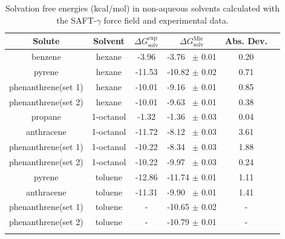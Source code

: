 \documentclass[preprint]{elsarticle}
\begin{document}
	\begin{table}
		\centering
		\caption{Solvation free energies (kcal/mol) in non-aqueous solvents calculated with the SAFT-$\gamma$ force field and experimental data.}
		\label{tbl:solv1}
		\begin{tabular}{cccccc}
			\hline\hline
			Solute       & Solvent   & $\Delta G_\text{solv}^\text{exp}$ & $\Delta G_\text{solv}^\text{Mie}$ & Abs. Dev.  \\ \hline
			benzene      & hexane    & -3.96                   & -3.76  $\,$ $\pm$ 0.01       & 0.20      &  \\
			pyrene       & hexane    & -11.53                  & -10.82 $\pm$ 0.02       & 0.71      &  \\
			phenanthrene(set 1) & hexane    & -10.01                  & -9.16  $\,$ $\pm$ 0.01       & 0.85      &  \\
			phenanthrene(set 2) & hexane    & -10.01                  & -9.63  $\,$ $\pm$ 0.01       & 0.38     &  \\
			propane      & 1-octanol & -1.32                   & -1.36  $\,$ $\pm$ 0.03       & 0.04      &  \\
			anthracene   & 1-octanol & -11.72                  & -8.12   $\,$ $\pm$ 0.03       & 3.61      &  \\
			phenanthrene(set 1) & 1-octanol & -10.22                  & -8.34  $\,$ $\pm$ 0.03       & 1.88      &  \\
			phenanthrene(set 2) & 1-octanol & -10.22                  & -9.97  $\,$ $\pm$ 0.03       & 0.24     &  \\			
			pyrene       & toluene   & -12.86                  & -11.74 $\pm$ 0.01       & 1.11      &  \\
			anthracene   & toluene   & -11.31                  & -9.90 $\,$ $\pm$ 0.01        & 1.41      &  \\ 
			phenanthrene(set 1)   & toluene   & -                  & -10.65 $\pm$ 0.02      & -     &  \\ 
			phenanthrene(set 2)   & toluene   & -                  & -10.79	 $\pm$  0.01        & -      &  \\ 
			\hline\hline
			&
		\end{tabular}
	\end{table}
\end{document}
